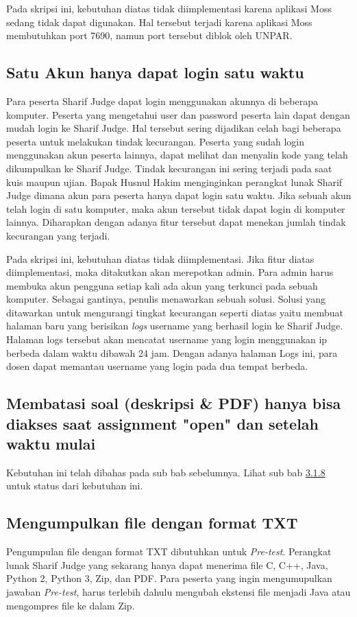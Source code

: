 Pada skripsi ini, kebutuhan diatas tidak diimplementasi karena aplikasi Moss sedang tidak dapat digunakan. Hal tersebut terjadi karena aplikasi Moss membutuhkan port 7690, namun port tersebut diblok oleh UNPAR.

\subsection{Satu Akun hanya dapat login satu waktu}
Para peserta Sharif Judge dapat login menggunakan akunnya di beberapa komputer. Peserta yang mengetahui user dan password peserta lain dapat dengan mudah login ke Sharif Judge. Hal tersebut sering dijadikan celah bagi beberapa peserta untuk melakukan tindak kecurangan. Peserta yang sudah login menggunakan akun peserta lainnya, dapat melihat dan menyalin kode yang telah dikumpulkan ke Sharif Judge. Tindak kecurangan ini sering terjadi pada saat kuis maupun ujian. Bapak Husnul Hakim menginginkan perangkat lunak Sharif Judge dimana akun para peserta hanya dapat login satu waktu. Jika sebuah akun telah login di satu komputer, maka akun tersebut tidak dapat login di komputer lainnya. Diharapkan dengan adanya fitur tersebut dapat menekan jumlah tindak kecurangan yang terjadi. 

Pada skripsi ini, kebutuhan diatas tidak diimplementasi. Jika fitur diatas diimplementasi, maka ditakutkan akan merepotkan admin. Para admin harus membuka akun pengguna setiap kali ada akun yang terkunci pada sebuah komputer. Sebagai gantinya, penulis menawarkan sebuah solusi. Solusi yang ditawarkan untuk mengurangi tingkat kecurangan seperti diatas yaitu membuat halaman baru yang berisikan \textit{logs} username yang berhasil login ke Sharif Judge. Halaman logs tersebut akan mencatat username yang login menggunakan ip berbeda dalam waktu dibawah 24 jam. Dengan adanya halaman Logs ini, para dosen dapat memantau username yang login pada dua tempat berbeda.	

\subsection{Membatasi soal (deskripsi \& PDF) hanya bisa diakses saat assignment "open" dan setelah waktu mulai}
Kebutuhan ini telah dibahas pada sub bab sebelumnya. Lihat sub bab \hyperref[subsec:membatasisoal]{3.1.8} untuk status dari kebutuhan ini.

\subsection{Mengumpulkan file dengan format TXT}
\label{subsec:filetxt}
Pengumpulan file dengan format TXT dibutuhkan untuk \textit{Pre-test}. Perangkat lunak Sharif Judge yang sekarang hanya dapat menerima file C, C++, Java, Python 2, Python 3, Zip, dan PDF. Para peserta yang ingin mengumupulkan jawaban \textit{Pre-test}, harus terlebih dahulu mengubah ekstensi file menjadi Java atau mengompres file ke dalam Zip. 

